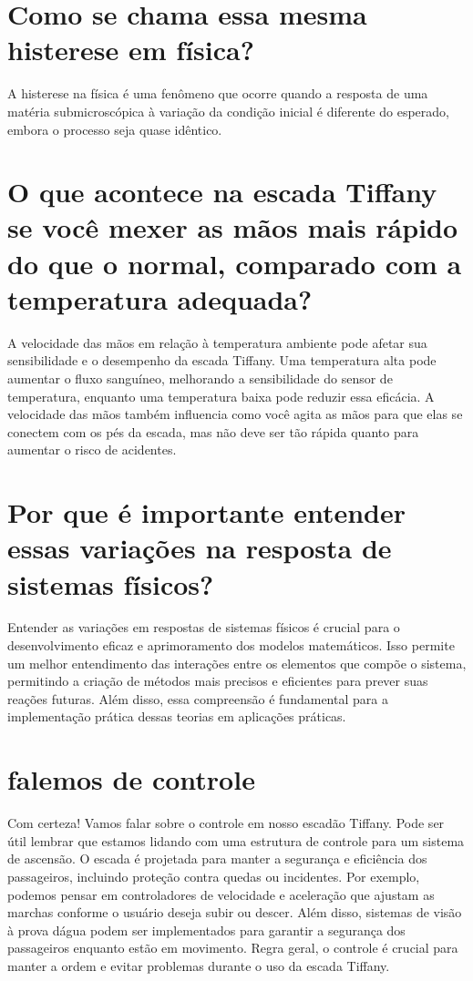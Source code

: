 \documentclass[11pt,a4paper]{article}
\begin{document}
\section{Como se chama essa mesma histerese em física?}
A histerese na física é uma fenômeno que ocorre quando a resposta de uma matéria submicroscópica à variação da condição inicial é diferente do esperado, embora o processo seja quase idêntico.

\section{O que acontece na escada Tiffany se você mexer as mãos mais rápido do que o normal, comparado com a temperatura adequada?}
A velocidade das mãos em relação à temperatura ambiente pode afetar sua sensibilidade e o desempenho da escada Tiffany. Uma temperatura alta pode aumentar o fluxo sanguíneo, melhorando a sensibilidade do sensor de temperatura, enquanto uma temperatura baixa pode reduzir essa eficácia. A velocidade das mãos também influencia como você agita as mãos para que elas se conectem com os pés da escada, mas não deve ser tão rápida quanto para aumentar o risco de acidentes.

\section{Por que é importante entender essas variações na resposta de sistemas físicos?}
Entender as variações em respostas de sistemas físicos é crucial para o desenvolvimento eficaz e aprimoramento dos modelos matemáticos. Isso permite um melhor entendimento das interações entre os elementos que compõe o sistema, permitindo a criação de métodos mais precisos e eficientes para prever suas reações futuras. Além disso, essa compreensão é fundamental para a implementação prática dessas teorias em aplicações práticas.

\section{falemos de controle}
Com certeza! Vamos falar sobre o controle em nosso escadão Tiffany. Pode ser útil lembrar que estamos lidando com uma estrutura de controle para um sistema de ascensão. O escada é projetada para manter a segurança e eficiência dos passageiros, incluindo proteção contra quedas ou incidentes. Por exemplo, podemos pensar em controladores de velocidade e aceleração que ajustam as marchas conforme o usuário deseja subir ou descer. Além disso, sistemas de visão à prova dágua podem ser implementados para garantir a segurança dos passageiros enquanto estão em movimento. Regra geral, o controle é crucial para manter a ordem e evitar problemas durante o uso da escada Tiffany.
\end{document}
